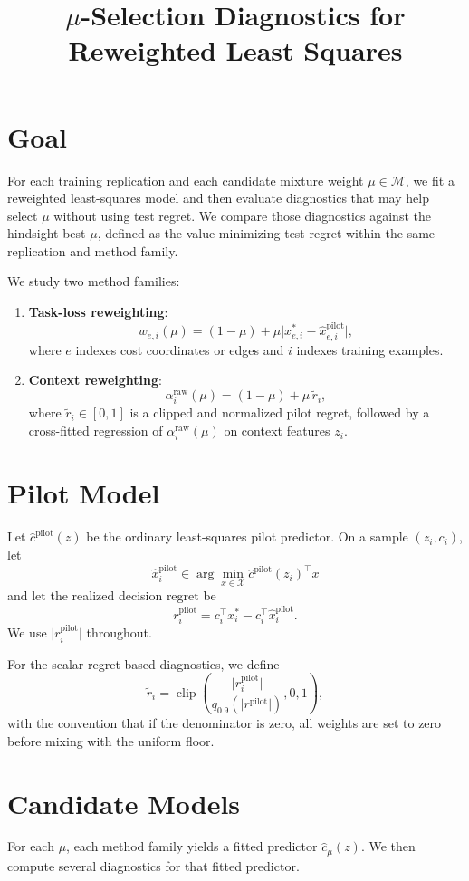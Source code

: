 \documentclass[11pt]{article}
\title{\(\mu\)-Selection Diagnostics for Reweighted Least Squares}
\author{}
\date{}
\begin{document}
\maketitle

\section*{Goal}
For each training replication and each candidate mixture weight \(\mu \in \mathcal{M}\), we fit a reweighted least-squares model and then evaluate diagnostics that may help select \(\mu\) without using test regret. We compare those diagnostics against the hindsight-best \(\mu\), defined as the value minimizing test regret within the same replication and method family.

We study two method families:
\begin{enumerate}
    \item \textbf{Task-loss reweighting}:
    \[
    w_{e,i}(\mu) = (1-\mu) + \mu \lvert x^*_{e,i} - \hat{x}_{e,i}^{\mathrm{pilot}} \rvert,
    \]
    where \(e\) indexes cost coordinates or edges and \(i\) indexes training examples.
    \item \textbf{Context reweighting}:
    \[
    \alpha_i^{\mathrm{raw}}(\mu) = (1-\mu) + \mu \,\widetilde{r}_i,
    \]
    where \(\widetilde{r}_i \in [0,1]\) is a clipped and normalized pilot regret, followed by a cross-fitted regression of \(\alpha_i^{\mathrm{raw}}(\mu)\) on context features \(z_i\).
\end{enumerate}

\section*{Pilot Model}
Let \(\hat{c}^{\mathrm{pilot}}(z)\) be the ordinary least-squares pilot predictor. On a sample \((z_i, c_i)\), let
\[
\hat{x}^{\mathrm{pilot}}_i \in \arg\min_{x \in \mathcal{X}} \hat{c}^{\mathrm{pilot}}(z_i)^\top x
\]
and let the realized decision regret be
\[
r_i^{\mathrm{pilot}} = c_i^\top x_i^* - c_i^\top \hat{x}^{\mathrm{pilot}}_i.
\]
We use \(\lvert r_i^{\mathrm{pilot}} \rvert\) throughout.

For the scalar regret-based diagnostics, we define
\[
\widetilde{r}_i
=
\operatorname{clip}\!\left(
\frac{\lvert r_i^{\mathrm{pilot}} \rvert}{q_{0.9}(\lvert r^{\mathrm{pilot}} \rvert)},
0,1
\right),
\]
with the convention that if the denominator is zero, all weights are set to zero before mixing with the uniform floor.

\section*{Candidate Models}
For each \(\mu\), each method family yields a fitted predictor \(\hat{c}_{\mu}(z)\). We then compute several diagnostics for that fitted predictor.
\end{document}
